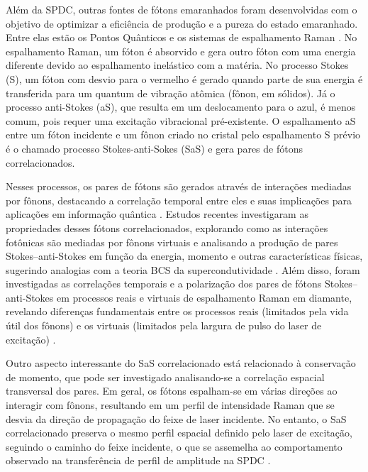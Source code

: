 \documentclass[brazil,12pt,a4paper,openany]{article}
\begin{document}
Além da SPDC,  outras fontes de fótons emaranhados foram desenvolvidas com o objetivo de optimizar a eficiência de produção e a pureza do estado emaranhado. Entre elas estão os Pontos Quânticos \cite{Stevenson2006Dots} e os sistemas de espalhamento Raman \cite{Jorio2017Cooper}. No espalhamento Raman, um fóton é absorvido e gera outro fóton com uma energia diferente devido ao espalhamento inelástico com a matéria. No processo Stokes (S), um fóton com desvio para o vermelho é gerado quando parte de sua energia é transferida para um quantum de vibração atômica (fônon, em sólidos). Já o processo anti-Stokes (aS), que resulta em um deslocamento para o azul, é menos comum, pois requer uma excitação vibracional pré-existente. O espalhamento aS entre um fóton incidente e um fônon criado no cristal pelo espalhamento S prévio é o chamado processo Stokes-anti-Sokes (SaS) e gera pares de fótons correlacionados.

Nesses processos, os pares de fótons são gerados através de interações mediadas por fônons, destacando a correlação temporal entre eles e suas implicações para aplicações em informação quântica \cite{de2019physical}. Estudos recentes investigaram as propriedades desses fótons correlacionados, explorando como as interações fotônicas são mediadas por fônons virtuais e analisando a produção de pares Stokes–anti-Stokes em função da energia, momento e outras características físicas, sugerindo analogias com a teoria BCS da supercondutividade \cite{junior2019stokes}. Além disso, foram investigadas as correlações temporais e a polarização dos pares de fótons Stokes–anti-Stokes em processos reais e virtuais de espalhamento Raman em diamante, revelando diferenças fundamentais entre os processos reais (limitados pela vida útil dos fônons) e os virtuais (limitados pela largura de pulso do laser de excitação) \cite{junior2020lifetime}.

Outro aspecto interessante do SaS correlacionado está relacionado à conservação de momento, que pode ser investigado analisando-se a correlação espacial transversal dos pares. Em geral, os fótons espalham-se em várias direções ao interagir com fônons, resultando em um perfil de intensidade Raman que se desvia da direção de propagação do feixe de laser incidente. No entanto, o SaS correlacionado preserva o mesmo perfil espacial definido pelo laser de excitação, seguindo o caminho do feixe incidente, o que se assemelha ao comportamento observado na transferência de perfil de amplitude na SPDC \cite{junior2019stokes}.

\end{document}
